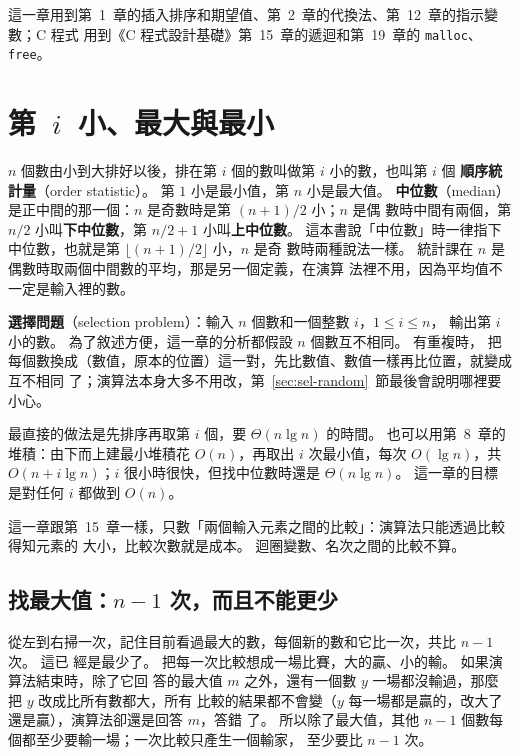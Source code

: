 這一章用到第~1~章的插入排序和期望值、第~2~章的代換法、第~12~章的指示變數；C 程式
用到《C 程式設計基礎》第~15~章的遞迴和第~19~章的 \texttt{malloc}、\texttt{free}。

\section{第~\texorpdfstring{$i$}{i}~小、最大與最小}
\label{sec:sel-minmax}

$n$ 個數由小到大排好以後，排在第 $i$ 個的數叫做第 $i$ 小的數，也叫第 $i$ 個
\textbf{順序統計量}（order statistic）。 第 $1$ 小是最小值，第 $n$ 小是最大值。
\textbf{中位數}（median）是正中間的那一個：$n$ 是奇數時是第 $(n+1)/2$ 小；$n$ 是偶
數時中間有兩個，第 $n/2$ 小叫\textbf{下中位數}，第 $n/2 + 1$ 小叫\textbf{上中位數}。
這本書說「中位數」時一律指下中位數，也就是第 $\lfloor (n+1)/2 \rfloor$ 小，$n$ 是奇
數時兩種說法一樣。 統計課在 $n$ 是偶數時取兩個中間數的平均，那是另一個定義，在演算
法裡不用，因為平均值不一定是輸入裡的數。

\textbf{選擇問題}（selection problem）：輸入 $n$ 個數和一個整數 $i$，$1 \le i \le n$，
輸出第 $i$ 小的數。 為了敘述方便，這一章的分析都假設 $n$ 個數互不相同。 有重複時，
把每個數換成（數值，原本的位置）這一對，先比數值、數值一樣再比位置，就變成互不相同
了；演算法本身大多不用改，第~\ref{sec:sel-random}~節最後會說明哪裡要小心。

最直接的做法是先排序再取第 $i$ 個，要 $\Theta(n \lg n)$ 的時間。 也可以用第~8~章的
堆積：由下而上建最小堆積花 $O(n)$，再取出 $i$ 次最小值，每次 $O(\lg n)$，共
$O(n + i \lg n)$；$i$ 很小時很快，但找中位數時還是 $\Theta(n \lg n)$。 這一章的目標
是對任何 $i$ 都做到 $O(n)$。

這一章跟第~15~章一樣，只數「兩個輸入元素之間的比較」：演算法只能透過比較得知元素的
大小，比較次數就是成本。 迴圈變數、名次之間的比較不算。

\subsection{找最大值：\texorpdfstring{$n - 1$}{n - 1} 次，而且不能更少}

從左到右掃一次，記住目前看過最大的數，每個新的數和它比一次，共比 $n - 1$ 次。 這已
經是最少了。 把每一次比較想成一場比賽，大的贏、小的輸。 如果演算法結束時，除了它回
答的最大值 $m$ 之外，還有一個數 $y$ 一場都沒輸過，那麼把 $y$ 改成比所有數都大，所有
比較的結果都不會變（$y$ 每一場都是贏的，改大了還是贏），演算法卻還是回答 $m$，答錯
了。 所以除了最大值，其他 $n - 1$ 個數每個都至少要輸一場；一次比較只產生一個輸家，
至少要比 $n - 1$ 次。

